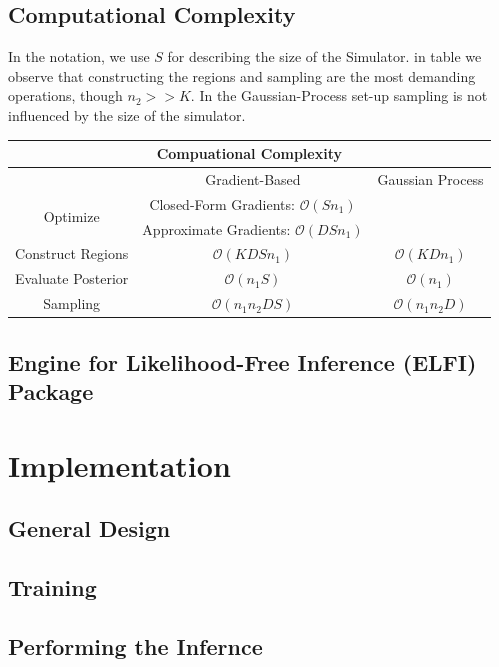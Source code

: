 \documentclass[11pt,twoside]{article}
\numberwithin{Theorem}{section}
\numberwithin{Definition}{section}
\numberwithin{Lemma}{section}
\numberwithin{Algorithm}{section}
\numberwithin{equation}{section}
\newcommand{\bigO}{\mathcal{O}}
\begin{document}
\subsection{Computational Complexity}

In the notation, we use $S$ for describing the size of the Simulator. in table we observe that constructing the regions and sampling are the most demanding operations, though $n_2 >> K$. In the Gaussian-Process set-up sampling is not influenced by the size of the simulator.

\begin{tabular}{ |c||c|c|  }
 \hline
 \multicolumn{3}{|c|}{Compuational Complexity} \\
  \hline
  & Gradient-Based     & Gaussian Process\\
  \hline
  \multirow{2}{3.5em}{Optimize}  & Closed-Form Gradients: $\bigO(Sn_1)$   &  \\
                               & Approximate Gradients: $\bigO(DSn_1)$  &  \\  
  \hline
  Construct Regions    & $\bigO(KDSn_1)$  & $\bigO(KDn_1)$ \\
  \hline
  Evaluate Posterior   & $\bigO(n_1S)$  & $\bigO(n_1)$ \\
  \hline
  Sampling             & $\bigO(n_1n_2DS)$ & $\bigO(n_1n_2D)$ \\
 \hline
\end{tabular}


\subsection{Engine for Likelihood-Free Inference (ELFI) Package}


\clearpage


\section{Implementation}

\subsection{General Design}

\subsection{Training}

\subsection{Performing the Infernce}
\end{document}
